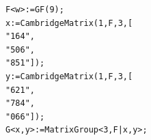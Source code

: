 \begin{verbatim}
F<w>:=GF(9);
x:=CambridgeMatrix(1,F,3,[
"164",
"506",
"851"]);
y:=CambridgeMatrix(1,F,3,[
"621",
"784",
"066"]);
G<x,y>:=MatrixGroup<3,F|x,y>;
\end{verbatim} 
